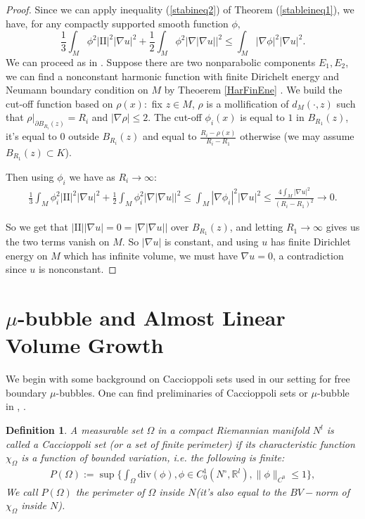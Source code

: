 \documentclass[12pt]{amsart}
\newcommand{\R}{\mathbb R}
\newcommand{\sff}{\mathrm{I\!I}}
\newcommand{\dive}{\text{div}}
\newtheorem{definition}[theorem]{Definition}
\numberwithin{equation}{section}
\begin{document}
	\begin{proof}
		Since we can apply inequality (\ref{stabineq2}) of Theorem (\ref{stableineq1}), we have, for any compactly supported smooth function $\phi,$
		\begin{equation*}
			\frac{1}{3}\int_M \phi^2 |\sff|^2 |\nabla u|^2 + \frac{1}{2}\int_M \phi^2 |\nabla |\nabla u||^2 \leq \int_M |\nabla \phi|^2 |\nabla u|^2.
		\end{equation*}
		We can proceed as in \cite{ChodoLiStryk2022-CompleteStableMinimal}. Suppose there are two nonparabolic components $E_1, E_2$, we can find a nonconstant harmonic function with finite Dirichelt energy and Neumann boundary condition on $M$ by Theoerem \ref{HarFinEne} . We build the cut-off function based on $\rho(x):$ fix $z\in M$, $\rho$ is a mollification of $d_M(\cdot, z)$ such that $\rho \vert_{\partial B_{R_i}(z)} =R_i$ and $|\nabla \rho| \leq 2$. The cut-off $\phi_i(x)$ is equal to $1$ in $B_{R_1}(z)$, it's equal to $0$ outside $B_{R_i}(z)$ and equal to $\frac{R_i -\rho(x)}{R_i-R_1}$ otherwise (we may assume  $B_{R_1}(z) \subset K$).

		Then using $\phi_i$  we have as $R_i \rightarrow \infty$:
	\begin{align*}
		\frac{1}{3}\int_M \phi_i^2 |\sff|^2 |\nabla u|^2 + \frac{1}{2}\int_M \phi_i^2 |\nabla |\nabla u||^2 \leq \int_M |\nabla \phi_i|^2 |\nabla u|^2 \leq \frac{4\int_M |\nabla u|^2}{(R_i-R_1)^2} \rightarrow 0.
	\end{align*}

	So we get that  $|\sff| |\nabla u|=0=|\nabla |\nabla u||$ over $B_{R_1}(z)$, and letting $R_1 \rightarrow \infty$ gives us the two terms vanish on $M$. So $|\nabla u|$ is constant, and using $u$ has finite Dirichlet energy on $M$ which has infinite volume, we must have $\nabla u=0$, a contradiction since $u$ is nonconstant. 
	\end{proof}
	


	\section{$\mu$-bubble and Almost Linear Volume Growth} \label{mububble}

	We begin with some background on Caccioppoli sets used in our setting for free boundary $\mu$-bubbles. One can find preliminaries of Caccioppoli sets or $\mu$-bubble in \cite{Maggi2012-SetsFinitePerimeter}, \cite{ChodoLiStryk2022-CompleteStableMinimal}.

	\begin{definition}
		A measurable set $\Omega$ in a compact Riemannian manifold $N^l$ is called a Caccioppoli set (or a set of finite perimeter) if its characteristic function $\chi_{\Omega}$ is a function of bounded variation, i.e. the following is finite:
		\begin{align*}
			P(\Omega):=\sup\Big\{\int_\Omega \dive(\phi), \phi \in C^1_0(N^{\circ},\R^l), \|\phi\|_{C^0} \leq 1\Big\},
		\end{align*}
		We call $P(\Omega)$ the perimeter of $\Omega$ inside $N$(it's also equal to the $BV-$norm of $\chi_{\Omega}$ inside $N$).
	\end{definition}
	
\end{document}
